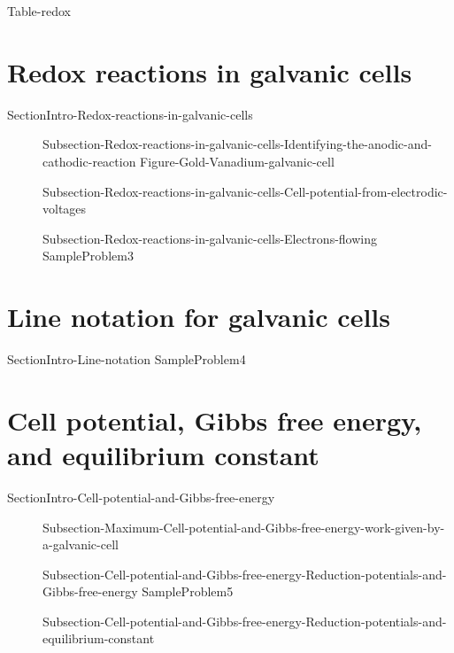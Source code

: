\documentclass[main.tex]{subfiles}
\newcommand\chapterlabel{Ch-electrochem}\setcounter{figurenewcounter}{0}\setcounter{tablenewcounter}{0}\setcounter{formulanewcounter}{0}\chapterpicture{../{\chapterlabel}/figure1}\chapterpicturelabel{PxFuel}
\begin{document}
{Table-redox} 


\section{Redox reactions in galvanic cells}{SectionIntro-Redox-reactions-in-galvanic-cells} 
\sloppy\begin{description}
\item[]{Subsection-Redox-reactions-in-galvanic-cells-Identifying-the-anodic-and-cathodic-reaction}
 {Figure-Gold-Vanadium-galvanic-cell}
  \item[]{Subsection-Redox-reactions-in-galvanic-cells-Cell-potential-from-electrodic-voltages}
   \item[]{Subsection-Redox-reactions-in-galvanic-cells-Electrons-flowing}
 {SampleProblem3}
\end{description}

\section{Line notation for galvanic cells}{SectionIntro-Line-notation}
  {SampleProblem4}



\section{Cell potential, Gibbs free energy, and equilibrium constant}{SectionIntro-Cell-potential-and-Gibbs-free-energy}
\sloppy\begin{description}
 \item[] {Subsection-Maximum-Cell-potential-and-Gibbs-free-energy-work-given-by-a-galvanic-cell}
  \item[] {Subsection-Cell-potential-and-Gibbs-free-energy-Reduction-potentials-and-Gibbs-free-energy}
 {SampleProblem5}
  \item[] {Subsection-Cell-potential-and-Gibbs-free-energy-Reduction-potentials-and-equilibrium-constant}
\end{description}
\end{document}
